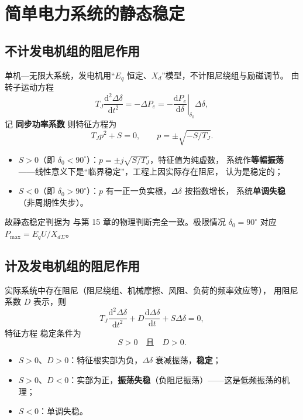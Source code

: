 \section{简单电力系统的静态稳定}

\subsection{不计发电机组的阻尼作用}

单机—无限大系统，发电机用“$E_q$ 恒定、$X_d$”模型，不计阻尼绕组与励磁调节。
由转子运动方程
\begin{equation}
  T_J\frac{\mathrm{d}^{2}\Delta\delta}{\mathrm{d}t^{2}}=-\Delta P_e
  =-\left.\frac{\mathrm{d}P_e}{\mathrm{d}\delta}\right|_{\delta_0}\Delta\delta ,
\end{equation}
记 \textbf{同步功率系数}
则特征方程为
\begin{equation}
  T_Jp^{2}+S=0,\qquad p=\pm\sqrt{-S/T_J}.
\end{equation}
\begin{itemize}
  \item $S>0$（即 $\delta_0<90^\circ$）：$p=\pm j\sqrt{S/T_J}$，特征值为纯虚数，
        系统作\textbf{等幅振荡}——线性意义下是“临界稳定”，工程上因实际存在阻尼，
        认为是稳定的；
  \item $S<0$（即 $\delta_0>90^\circ$）：$p$ 有一正一负实根，$\Delta\delta$ 按指数增长，
        系统\textbf{单调失稳}（非周期性失步）。
\end{itemize}
故静态稳定判据为
与第 15 章的物理判断完全一致。极限情况 $\delta_0=90^\circ$ 对应 $P_{\max}=E_qU/X_{d\Sigma}$。

\subsection{计及发电机组的阻尼作用}

实际系统中存在阻尼（阻尼绕组、机械摩擦、风阻、负荷的频率效应等），
用阻尼系数 $D$ 表示，则
\begin{equation}
  T_J\frac{\mathrm{d}^{2}\Delta\delta}{\mathrm{d}t^{2}}
  +D\frac{\mathrm{d}\Delta\delta}{\mathrm{d}t}+S\Delta\delta=0 ,
\end{equation}
特征方程
稳定条件为
\begin{equation}
  S>0\quad\text{且}\quad D>0 .
\end{equation}
\begin{itemize}
  \item $S>0$、$D>0$：特征根实部为负，$\Delta\delta$ 衰减振荡，\textbf{稳定}；
  \item $S>0$、$D<0$：实部为正，\textbf{振荡失稳}（负阻尼振荡）——这是低频振荡的机理；
  \item $S<0$：单调失稳。
\end{itemize}

